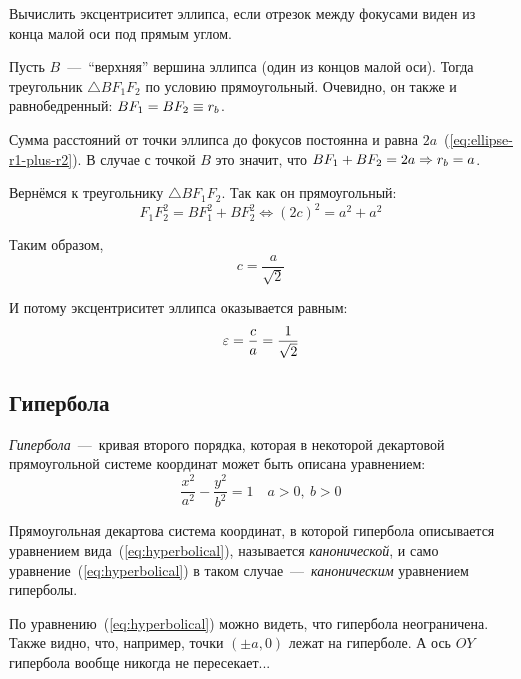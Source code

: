 \documentclass[a4paper,12pt]{article}
\begin{document}
  Вычислить эксцентриситет эллипса, если отрезок между фокусами виден из конца малой оси под прямым углом.
  
  \begin{solution}
    Пусть $B$~---~``верхняя'' вершина эллипса (один из концов малой оси).
    Тогда треугольник $\triangle BF_1F_2$ по условию прямоугольный.
    Очевидно, он также и равнобедренный: $BF_1 \hm= BF_2 \hm\equiv r_b$.
    
    Сумма расстояний от точки эллипса до фокусов постоянна и равна $2a$~(\ref{eq:ellipse-r1-plus-r2}).
    В случае с точкой $B$ это значит, что $BF_1 \hm+ BF_2 \hm= 2a \hm\Rightarrow r_b \hm= a$.
    
    Вернёмся к треугольнику $\triangle BF_1F_2$.
    Так как он прямоугольный:
    \[
      F_1F_2^2 = BF_1^2 + BF_2^2 \Leftrightarrow (2c)^2 = a^2 + a^2 
    \]
    
    Таким образом,
    \[
      c = \frac{a}{\sqrt{2}}
    \]
    
    И потому эксцентриситет эллипса оказывается равным:
    \[
      \varepsilon = \frac{c}{a} = \frac{1}{\sqrt{2}}
    \]
  \end{solution}
  
  
  \subsection{Гипербола}
  
  \begin{definition}
    \emph{Гипербола}~---~кривая второго порядка, которая в некоторой декартовой прямоугольной системе координат может быть описана уравнением:
    \begin{equation}\label{eq:hyperbolical}
      \boxed{
        \frac{x^2}{a^2} - \frac{y^2}{b^2} = 1
      }\quad a > 0,\ b > 0
    \end{equation}
    
    Прямоугольная декартова система координат, в которой гипербола описывается уравнением вида~(\ref{eq:hyperbolical}), называется \emph{канонической}, и само уравнение~(\ref{eq:hyperbolical}) в таком случае~---~\emph{каноническим} уравнением гиперболы.
  \end{definition}
  
  По уравнению~(\ref{eq:hyperbolical}) можно видеть, что гипербола неограничена.
  Также видно, что, например, точки $(\pm a, 0)$ лежат на гиперболе.
  А ось $OY$ гипербола вообще никогда не пересекает...
  
\end{document}
